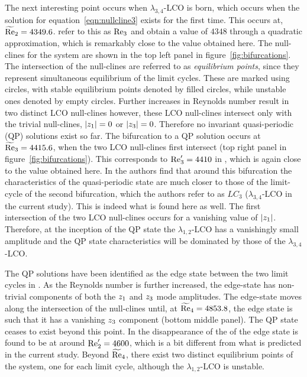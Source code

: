 The next interesting point occurs when $\lambda_{3,4}$-LCO is born, which occurs when the solution for equation~\eqref{eqn:nullcline3} exists for the first time. This occurs at, 
$\widetilde{\mathrm{Re}}_{2} = 4349.6$. \cite{bengana19} refer to this as $\mathrm{Re}_{3}$ and obtain a value of $4348$ through a quadratic approximation, which is remarkably close to the value obtained here. The null-clines for the system are shown in the top left panel in figure~\ref{fig:bifurcations}. The intersection of the null-clines are referred to as \emph{equilibrium points}, since they represent simultaneous equilibrium of the limit cycles. These are marked using circles, with stable equilibrium points denoted by filled circles, while unstable ones denoted by empty circles. Further increases in Reynolds number result in two distinct LCO null-clines however, these LCO null-clines intersect only with the trivial null-clines, $|z_{1}|=0$ or $|z_{3}|=0$. Therefore no invariant quasi-periodic (QP) solutions exist so far. The bifurcation to a QP solution occurs at $\widetilde{\mathrm{Re}}_{3}=4415.6$, when the two LCO null-clines first intersect (top right panel in figure~\ref{fig:bifurcations}). This corresponds to $\mathrm{Re}'_{3}=4410$ in \cite{bengana19}, which is again close to the value obtained here. In \cite{bengana19} the authors find that around this bifurcation the characteristics of the quasi-periodic state are much closer to those of the limit-cycle of the second bifurcation, which the authors refer to as $LC_{3}$ ($\lambda_{3,4}$-LCO in the current study). This is indeed what is found here as well. The first intersection of the two LCO null-clines occurs for a vanishing value of $|z_{1}|$. Therefore, at the inception of the QP state the $\lambda_{1,2}$-LCO has a vanishingly small amplitude and the QP state characteristics will be dominated by those of the $\lambda_{3,4}$-LCO.

The QP solutions have been identified as the edge state between the two limit cycles in \cite{bengana19}. As the Reynolds number is further increased, the edge-state has non-trivial components of both the $z_{1}$ and $z_{3}$ mode amplitudes. The edge-state moves along the intersection of the null-clines until, at $\widetilde{\mathrm{Re}}_{4}=4853.8$, the edge state is such that it has a vanishing $z_{3}$ component (bottom middle panel). The QP state ceases to exist beyond this point. In \cite{bengana19} the disappearance of the of the edge state is found to be at around $\mathrm{Re}'_{2}=4600$, which is a bit different from what is predicted in the current study. Beyond $\widetilde{\mathrm{Re}}_{4}$, there exist two distinct equilibrium points of the system, one for each limit cycle, although the $\lambda_{1,2}$-LCO is unstable. 

